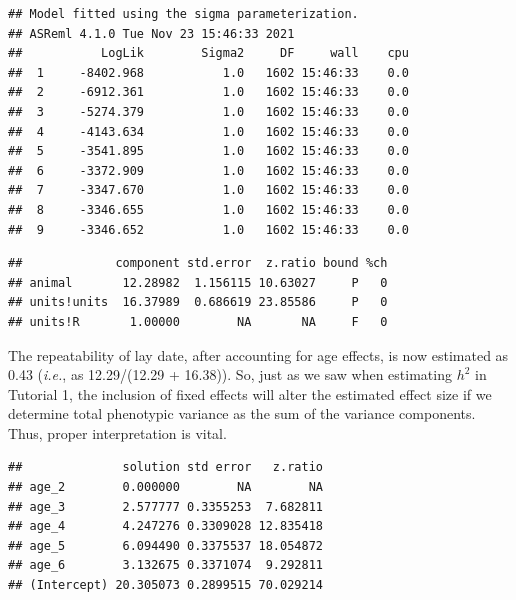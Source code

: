 \documentclass[
  12pt,
]{book}
\newenvironment{Shaded}{\begin{snugshade}}{\end{snugshade}}
\newcommand{\DataTypeTok}[1]{\textcolor[rgb]{0.13,0.29,0.53}{#1}}
\newcommand{\KeywordTok}[1]{\textcolor[rgb]{0.13,0.29,0.53}{\textbf{#1}}}
\newcommand{\NormalTok}[1]{#1}
\newcommand{\OperatorTok}[1]{\textcolor[rgb]{0.81,0.36,0.00}{\textbf{#1}}}
\newcommand{\OtherTok}[1]{\textcolor[rgb]{0.56,0.35,0.01}{#1}}
\begin{document}
\begin{verbatim}
## Model fitted using the sigma parameterization.
## ASReml 4.1.0 Tue Nov 23 15:46:33 2021
##           LogLik        Sigma2     DF     wall    cpu
##  1     -8402.968           1.0   1602 15:46:33    0.0
##  2     -6912.361           1.0   1602 15:46:33    0.0
##  3     -5274.379           1.0   1602 15:46:33    0.0
##  4     -4143.634           1.0   1602 15:46:33    0.0
##  5     -3541.895           1.0   1602 15:46:33    0.0
##  6     -3372.909           1.0   1602 15:46:33    0.0
##  7     -3347.670           1.0   1602 15:46:33    0.0
##  8     -3346.655           1.0   1602 15:46:33    0.0
##  9     -3346.652           1.0   1602 15:46:33    0.0
\end{verbatim}

\begin{Shaded}
\end{Shaded}

\begin{verbatim}
##             component std.error  z.ratio bound %ch
## animal       12.28982  1.156115 10.63027     P   0
## units!units  16.37989  0.686619 23.85586     P   0
## units!R       1.00000        NA       NA     F   0
\end{verbatim}

The repeatability of lay date, after accounting for age effects, is now estimated as 0.43 (\emph{i.e.}, as 12.29/(12.29 + 16.38)).
So, just as we saw when estimating \(h^2\) in Tutorial 1, the inclusion of fixed effects will alter the estimated effect size if we determine total phenotypic variance as the sum of the variance components. Thus, proper interpretation is vital.

\begin{Shaded}
\end{Shaded}

\begin{verbatim}
##              solution std error   z.ratio
## age_2        0.000000        NA        NA
## age_3        2.577777 0.3355253  7.682811
## age_4        4.247276 0.3309028 12.835418
## age_5        6.094490 0.3375537 18.054872
## age_6        3.132675 0.3371074  9.292811
## (Intercept) 20.305073 0.2899515 70.029214
\end{verbatim}
\end{document}
